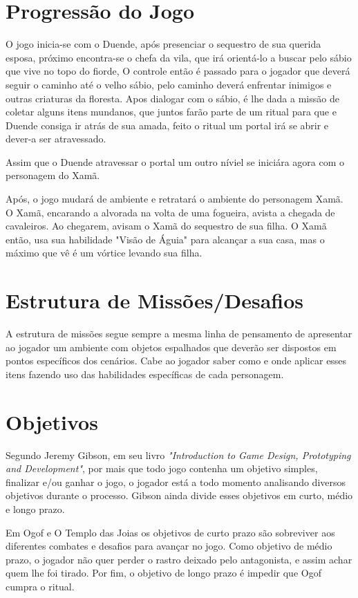 \section{Progressão do Jogo}
O jogo inicia-se com o Duende, após presenciar o sequestro de sua querida esposa, próximo encontra-se o chefa da vila, que irá orientá-lo a buscar pelo sábio que vive no topo do fiorde, O controle então é passado para o jogador que deverá seguir o caminho até o velho sábio, pelo caminho deverá enfrentar inimigos e outras criaturas da floresta. Apos dialogar com o sábio, é lhe dada a missão de coletar alguns itens mundanos, que juntos farão parte de um ritual para que e Duende consiga ir atrás de sua amada, feito o ritual um portal irá se abrir e dever-a ser atravessado.

Assim que o Duende atravessar o portal um outro níviel se iniciára agora com o personagem do Xamã.

Após, o jogo mudará de ambiente e retratará o ambiente do personagem Xamã. O Xamã, encarando a alvorada na volta de uma fogueira, avista a chegada de cavaleiros. Ao chegarem, avisam o Xamã do sequestro de sua filha. O Xamã então, usa sua habilidade "Visão de Águia" para alcançar a sua casa, mas o máximo que vê é um vórtice levando sua filha.

\section{Estrutura de Missões/Desafios}

A estrutura de missões segue sempre a mesma linha de pensamento de apresentar ao jogador um ambiente com objetos espalhados que deverão ser dispostos em pontos específicos dos cenários. Cabe ao jogador saber como e onde aplicar esses itens fazendo uso das habilidades específicas de cada personagem.

\section{Objetivos}

Segundo Jeremy Gibson, em seu livro \textit{"Introduction to Game Design, Prototyping and Development"}, por mais que todo jogo contenha um objetivo simples, finalizar e/ou ganhar o jogo, o jogador está a todo momento analisando diversos objetivos durante o processo. Gibson ainda divide esses objetivos em curto, médio e longo prazo. \cite{gibson2014}

Em Ogof e O Templo das Joias os objetivos de curto prazo são sobreviver aos diferentes combates e desafios para avançar no jogo. Como objetivo de médio prazo, o jogador não quer perder o rastro deixado pelo antagonista, e assim achar quem lhe foi tirado. Por fim, o objetivo de longo prazo é impedir que Ogof cumpra o ritual.


